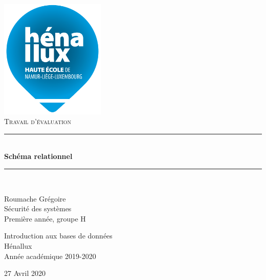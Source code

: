 \documentclass[a4paper]{article}
\newcommand{\HRule}{\rule{\linewidth}{0.5mm}}
\newcommand{\bgimg}[1]{
\AddToShipoutPicture
    {
        \put(\LenToUnit{0 cm},\LenToUnit{0 cm})
        {
            \texttt{[image: \#1]}
        }
    }
}
\begin{document}

















\begin{titlepage}
    \begin{sffamily}
        \begin{center}

            \includegraphics[width=5cm]{images/LogoHenallux.PNG}~\\[1.5cm]
            \textsc{\Large Travail d'évaluation}\\[1.5cm]

            \HRule \\[0.4cm]
            { \huge \bfseries Schéma relationnel\\[0.4cm] }
            \HRule \\[2cm]

            \begin{minipage}{0.4\textwidth}
                \begin{flushleft} \large
                    Roumache Grégoire\\
                    Sécurité des systèmes\\
                    Première année, groupe H \\
                \end{flushleft}
            \end{minipage}
            \begin{minipage}{0.55\textwidth}
            \begin{flushright} \large
                Introduction aux bases de données\\
                Hénallux\\
                Année académique 2019-2020\\
            \end{flushright}
            \end{minipage}
            \vfill

            {\large 27 Avril 2020}
        \end{center}
    \end{sffamily}
\end{titlepage}
\end{document}
